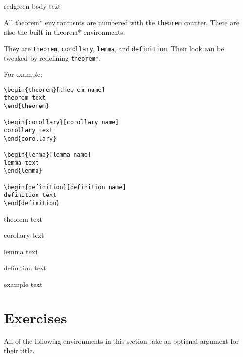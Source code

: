 \documentclass{article}
\begin{document}
\begin{theorem*}[name]{red}{green}
body text
\end{theorem*}

All theorem* environments are numbered with the \texttt{theorem} counter.
There are also the built-in theorem* environments.


They are \texttt{theorem}, \texttt{corollary}, \texttt{lemma}, and \texttt{definition}.
Their look can be tweaked by redefining \texttt{theorem*}.

For example:

\begin{verbatim}
\begin{theorem}[theorem name]
theorem text
\end{theorem}

\begin{corollary}[corollary name]
corollary text
\end{corollary}

\begin{lemma}[lemma name]
lemma text
\end{lemma}

\begin{definition}[definition name]
definition text
\end{definition}
\end{verbatim}

\begin{theorem}
theorem text
\end{theorem}

\begin{corollary}
corollary text
\end{corollary}

\begin{lemma}
lemma text
\end{lemma}

\begin{definition}
definition text
\end{definition}

\begin{example}
	example text
\end{example}

\section{Exercises}

All of the following environments in this section take an optional argument for their title.
\end{document}
